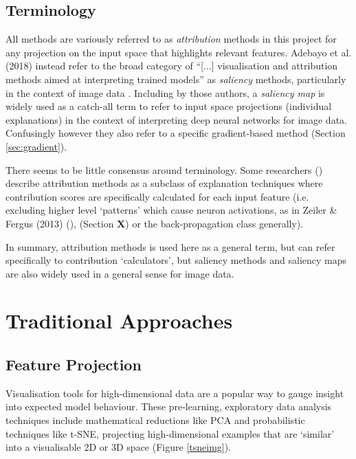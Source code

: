 \documentclass[main]{subfiles}
\begin{document}
\subsection*{Terminology}
All methods are variously referred to as \textit{attribution} methods in this project for any projection on the input space that highlights relevant features. Adebayo et al. (2018) instead refer to the broad category of ``[...] visualisation and attribution methods aimed at interpreting trained models'' as \textit{saliency} methods, particularly in the context of image data \cite{sanity}. Including by those authors, a \textit{saliency map} is widely used as a catch-all term to refer to input space projections (individual explanations) in the context of interpreting deep neural networks for image data. Confusingly however they also refer to a specific gradient-based method (Section \ref{sec:gradient}). 

There seems to be little consensus around terminology. Some researchers (\cite{patternnet}) describe attribution methods as a subclass of explanation techniques where contribution scores are specifically calculated for each input feature (i.e. excluding higher level `patterns' which cause neuron activations, as in Zeiler \& Fergus (2013) (\cite{zeilerfergus2013}), (Section \textbf{X}) or the back-propagation class generally). 

In summary, attribution methods is used here as a general term, but can refer specifically to contribution `calculators', but saliency methods and saliency maps are also widely used in a general sense for image data.

\section{Traditional Approaches}

\subsection{Feature Projection}
Visualisation tools for high-dimensional data are a popular way to gauge insight into expected model behaviour.  These pre-learning, exploratory data analysis techniques include mathematical reductions like PCA and probabilistic techniques like t-SNE,  projecting high-dimensional examples that are `similar' into a visualisable 2D or 3D space \cite{tsnepaper} (Figure \ref{tsneimg}).
\end{document}
